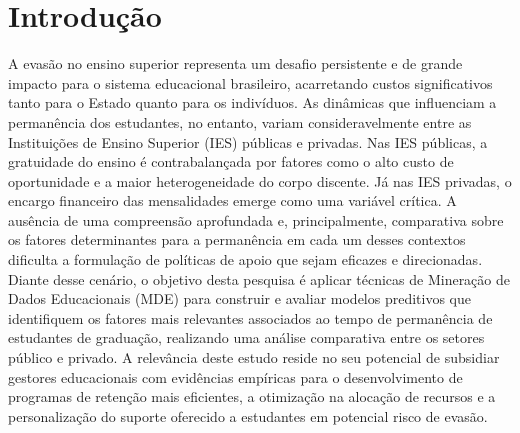 \documentclass[english, brazilian]{RBIEarticle}
\begin{document}
\pagebreak


\section{Introdução}
A evasão no ensino superior representa um desafio persistente e de grande impacto para o sistema educacional brasileiro, acarretando custos significativos tanto para o Estado quanto para os indivíduos. As dinâmicas que influenciam a permanência dos estudantes, no entanto, variam consideravelmente entre as Instituições de Ensino Superior (IES) públicas e privadas. Nas IES públicas, a gratuidade do ensino é contrabalançada por fatores como o alto custo de oportunidade e a maior heterogeneidade do corpo discente. Já nas IES privadas, o encargo financeiro das mensalidades emerge como uma variável crítica. A ausência de uma compreensão aprofundada e, principalmente, comparativa sobre os fatores determinantes para a permanência em cada um desses contextos dificulta a formulação de políticas de apoio que sejam eficazes e direcionadas. Diante desse cenário, o objetivo desta pesquisa é aplicar técnicas de Mineração de Dados Educacionais (MDE) para construir e avaliar modelos preditivos que identifiquem os fatores mais relevantes associados ao tempo de permanência de estudantes de graduação, realizando uma análise comparativa entre os setores público e privado. A relevância deste estudo reside no seu potencial de subsidiar gestores educacionais com evidências empíricas para o desenvolvimento de programas de retenção mais eficientes, a otimização na alocação de recursos e a personalização do suporte oferecido a estudantes em potencial risco de evasão.
\end{document}
